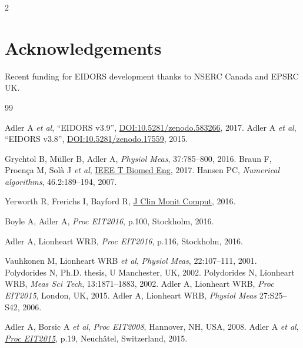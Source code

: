 \documentclass[10pt,letterpaper]{article}
\renewenvironment{thebibliography}[1]{%
    \begin{oldthebibliography}{#1}%
      \setlength{\parskip}{0ex}%
      \setlength{\itemsep}{0ex}%
  }%
  {%
    \end{oldthebibliography}%
  }
\begin{document}
\begin{multicols}{2}
\section*{Acknowledgements}
Recent funding for EIDORS development thanks to
NSERC Canada and EPSRC UK.

\footnotesize
\begin{thebibliography}{99}
   Adler A {\em et al}, ``EIDORS v3.9'',
   \href{http://dx.doi.org/10.5281/zenodo.583266}{DOI:10.5281/zenodo.583266},
    2017.
   Adler A {\em et al}, ``EIDORS v3.8'',
   \href{http://dx.doi.org/10.5281/zenodo.17559}{DOI:10.5281/zenodo.17559},
    2015.

   Grychtol B, Müller B, Adler A,
   {\em Physiol Meas}, 37:785--800, 2016.
   Braun F, Proença M, Solà J {\em et al}, \href{http://dx.doi.org/10.1109/TBME.2017.2659540}{IEEE T Biomed Eng}, 2017.
   Hansen PC, {\em Numerical algorithms}, 46.2:189--194, 2007.

Yerworth R, Frerichs I, Bayford R, \href{http://dx.doi.org/10.1007/s10877-016-9920-y}{J Clin Monit Comput}, 2016.

Boyle A, Adler A,
{\em Proc EIT2016}, p.100, Stockholm,  2016.

Adler A, Lionheart WRB, 
{\em Proc EIT2016}, p.116, Stockholm,  2016.

   Vauhkonen M, Lionheart WRB {\em  et al},
   {\em  Physiol Meas}, 22:107--111, 2001.
   Polydorides N,
 Ph.D. thesis, U Manchester, UK, 2002.
   Polydorides N, Lionheart WRB,
   {\em Meas Sci Tech}, 13:1871--1883, 2002.
Adler A, Lionheart WRB,
{\em Proc EIT2015}, London, UK, 2015.
%
Adler A, Lionheart WRB,
{\em Physiol Meas} 27:S25--S42, 2006.

Adler A, Borsic A {\em et al},
{\em Proc EIT2008}, Hannover, NH, USA, 2008.
Adler A {\em et al}, %
\href{https://zenodo.org/record/17752}{\em Proc EIT2015}, p.19, 
 Neuchâtel, Switzerland, 2015.
\end{thebibliography}
\end{multicols}
\end{document}
